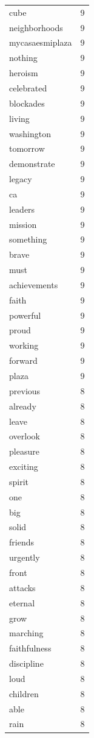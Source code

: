 \begin{tabular}{lr}
cube & 9 \\
neighborhoods & 9 \\
mycasaesmiplaza & 9 \\
nothing & 9 \\
heroism & 9 \\
celebrated & 9 \\
blockades & 9 \\
living & 9 \\
washington & 9 \\
tomorrow & 9 \\
demonstrate & 9 \\
legacy & 9 \\
ca & 9 \\
leaders & 9 \\
mission & 9 \\
something & 9 \\
brave & 9 \\
must & 9 \\
achievements & 9 \\
faith & 9 \\
powerful & 9 \\
proud & 9 \\
working & 9 \\
forward & 9 \\
plaza & 9 \\
previous & 8 \\
already & 8 \\
leave & 8 \\
overlook & 8 \\
pleasure & 8 \\
exciting & 8 \\
spirit & 8 \\
one & 8 \\
big & 8 \\
solid & 8 \\
friends & 8 \\
urgently & 8 \\
front & 8 \\
attacks & 8 \\
eternal & 8 \\
grow & 8 \\
marching & 8 \\
faithfulness & 8 \\
discipline & 8 \\
loud & 8 \\
children & 8 \\
able & 8 \\
rain & 8 \\

\end{tabular}
